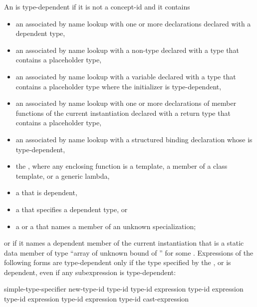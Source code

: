 \pnum
An
is type-dependent if it is not a concept-id and it contains
\begin{itemize}
\item
an
associated by name lookup with one or more declarations
declared with a dependent type,
\item
an
associated by name lookup with
a non-type 
declared with a type
that contains a placeholder type,
\item
an
associated by name lookup with
a variable declared with a type that contains a placeholder type
where the initializer is type-dependent,
\item
an  associated by name lookup with one or more
declarations of member functions of the current instantiation declared
with a return type that contains a placeholder type,
\item
an  associated by name lookup with
a structured binding declaration whose
 is type-dependent,
\item
the
, where any enclosing function is a
template, a member of a class template, or a generic lambda,
\item
a
that is dependent,
\item
a
that specifies a dependent type, or
\item
a
or a
that names a member of an unknown specialization;
\end{itemize}
or if it names a dependent member of the current instantiation that is a static
data member of type
``array of unknown bound of '' for some .
Expressions of the following forms are type-dependent only if the type
specified by the
,
or
is dependent, even if any subexpression is type-dependent:

\begin{ncsimplebnf}
simple-type-specifier \terminal{(}  \terminal{)}\br
\opt{\terminal{::}}   new-type-id \br
\opt{\terminal{::}}   \terminal{(} type-id \terminal{)} \br
{} \terminal{<} type-id \terminal{>} \terminal{(} expression \terminal{)}\br
{} \terminal{<} type-id \terminal{>} \terminal{(} expression \terminal{)}\br
{} \terminal{<} type-id \terminal{>} \terminal{(} expression \terminal{)}\br
{} \terminal{<} type-id \terminal{>} \terminal{(} expression \terminal{)}\br
\terminal{(} type-id \terminal{)} cast-expression
\end{ncsimplebnf}

